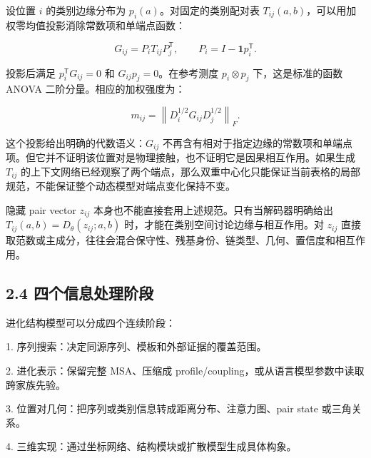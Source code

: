 \documentclass[10pt]{article}
\begin{document}

设位置 \(i\) 的类别边缘分布为 \(p_i(a)\)。对固定的类别配对表 \(T_{ij}(a,b)\)，可以用加权零均值投影消除常数项和单端点函数：\par


\begin{equation}
G_{ij}=P_iT_{ij}P_j^{\mathsf T},
\qquad
P_i=I-\mathbf 1p_i^{\mathsf T}.
\end{equation}

投影后满足 \(p_i^{\mathsf T}G_{ij}=0\) 和 \(G_{ij}p_j=0\)。在参考测度 \(p_i\otimes p_j\) 下，这是标准的函数 ANOVA 二阶分量。相应的加权强度为：\par


\begin{equation}
m_{ij}=\left\|D_i^{1/2}G_{ij}D_j^{1/2}\right\|_F.
\end{equation}

这个投影给出明确的代数语义：\(G_{ij}\) 不再含有相对于指定边缘的常数项和单端点项。但它并不证明该位置对是物理接触，也不证明它是因果相互作用。如果生成 \(T_{ij}\) 的上下文网络已经观察了两个端点，那么双重中心化只能保证当前表格的局部规范，不能保证整个动态模型对端点变化保持不变。\par

隐藏 pair vector \(z_{ij}\) 本身也不能直接套用上述规范。只有当解码器明确给出 \(T_{ij}(a,b)=D_\theta(z_{ij};a,b)\) 时，才能在类别空间讨论边缘与相互作用。对 \(z_{ij}\) 直接取范数或主成分，往往会混合保守性、残基身份、链类型、几何、置信度和相互作用。\par

\subsection*{2.4 四个信息处理阶段}


进化结构模型可以分成四个连续阶段：\par

1. 序列搜索：决定同源序列、模板和外部证据的覆盖范围。\par

2. 进化表示：保留完整 MSA、压缩成 profile/coupling，或从语言模型参数中读取跨家族先验。\par

3. 位置对几何：把序列或类别信息转成距离分布、注意力图、pair state 或三角关系。\par

4. 三维实现：通过坐标网络、结构模块或扩散模型生成具体构象。\par
\end{document}
